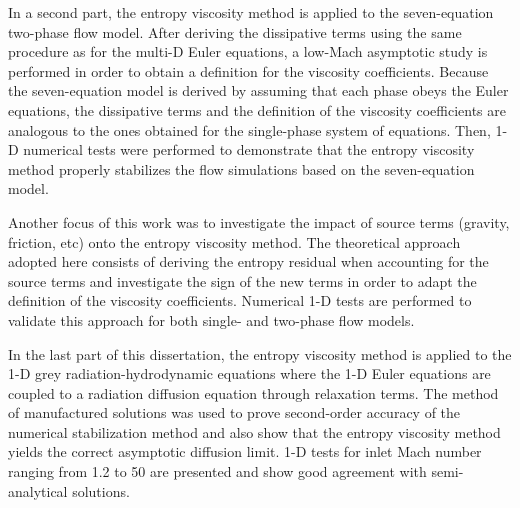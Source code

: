 In a second part, the entropy viscosity method is applied to the seven-equation two-phase flow model. After deriving the dissipative terms using the same procedure as for the multi-D Euler equations, a low-Mach asymptotic study is performed in order to obtain a definition for the viscosity coefficients. Because the seven-equation model is derived by assuming that each phase obeys the Euler equations, the dissipative terms and the definition of the viscosity coefficients are analogous to the ones obtained for the single-phase system of equations. Then, 1-D numerical tests were performed to demonstrate that the entropy viscosity method  properly stabilizes the flow simulations based on the seven-equation model.

Another focus of this work was to investigate the impact of source terms (gravity, friction, etc) onto the entropy viscosity method. The theoretical approach adopted here consists of deriving the entropy residual when accounting for the source terms and investigate the sign of the new terms in order to adapt the definition of the viscosity coefficients. Numerical 1-D tests are performed to validate this approach for both single- and two-phase flow models.

In the last part of this dissertation, the entropy viscosity method is applied to the 1-D grey radiation-hydrodynamic equations where the 1-D Euler equations are coupled to a radiation diffusion equation through relaxation terms. The method of manufactured solutions was used to prove second-order accuracy of the numerical stabilization method and also show that the entropy viscosity method yields the correct asymptotic diffusion limit. 1-D tests for inlet Mach number ranging from 1.2 to 50 are presented and show good agreement with semi-analytical solutions.  

\pagebreak{}

